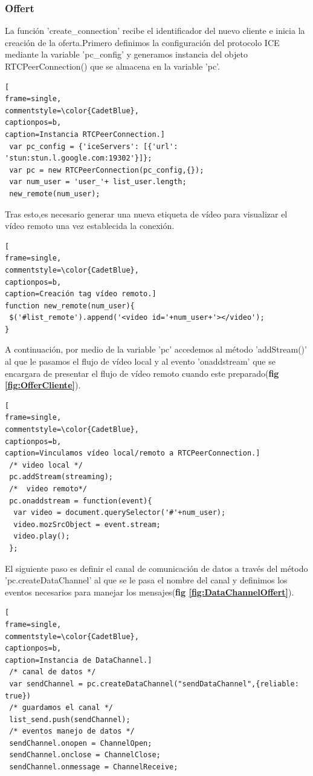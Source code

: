 
\subsubsection{Offert}
La función 'create\_connection' recibe el identificador del nuevo cliente e inicia la creación de la oferta.Primero definimos la configuración del  protocolo ICE mediante la variable 'pc\_config' y generamos instancia del objeto RTCPeerConnection() que se almacena en la variable 'pc'.
\begin{lstlisting}[
frame=single,
commentstyle=\color{CadetBlue},
captionpos=b,
caption=Instancia RTCPeerConnection.]
 var pc_config = {'iceServers': [{'url': 'stun:stun.l.google.com:19302'}]};
 var pc = new RTCPeerConnection(pc_config,{});
 var num_user = 'user_'+ list_user.length;
 new_remote(num_user);
\end{lstlisting}
Tras esto,es necesario generar una nueva etiqueta de vídeo para visualizar el vídeo remoto una vez establecida la conexión.
\begin{lstlisting}[
frame=single,
commentstyle=\color{CadetBlue},
captionpos=b,
caption=Creación tag vídeo remoto.]
function new_remote(num_user){
 $('#list_remote').append('<video id='+num_user+'></video');
}
\end{lstlisting}
A continuación, por medio de la variable 'pc' accedemos al método 'addStream()' al que le pasamos el flujo de vídeo local y al evento 'onaddstream' que se encargara de presentar el flujo de vídeo remoto cuando este preparado(\textbf{fig \ref{fig:OfferCliente}}).
\begin{lstlisting}[
frame=single,
commentstyle=\color{CadetBlue},
captionpos=b,
caption=Vinculamos vídeo local/remoto a RTCPeerConnection.]
 /* video local */
 pc.addStream(streaming);
 /*  video remoto*/
 pc.onaddstream = function(event){
  var video = document.querySelector('#'+num_user);
  video.mozSrcObject = event.stream;
  video.play();
 };
\end{lstlisting}
El siguiente paso es definir el canal de comunicación de datos a través del método 'pc.createDataChannel' al que se le pasa el nombre del canal y definimos los eventos necesarios para manejar los mensajes(\textbf{fig \ref{fig:DataChannelOffert}}).
\begin{lstlisting}[
frame=single,
commentstyle=\color{CadetBlue},
captionpos=b,
caption=Instancia de DataChannel.]
 /* canal de datos */
 var sendChannel = pc.createDataChannel("sendDataChannel",{reliable: true})
 /* guardamos el canal */
 list_send.push(sendChannel);	
 /* eventos manejo de datos */
 sendChannel.onopen = ChannelOpen;
 sendChannel.onclose = ChannelClose;
 sendChannel.onmessage = ChannelReceive;
\end{lstlisting}
